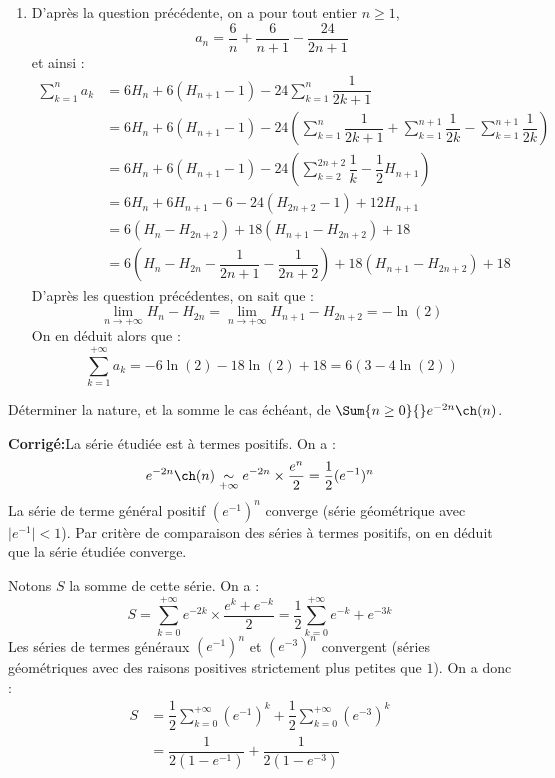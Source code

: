 \documentclass[a4paper,twoside,french,10pt]{VcCours}
\newcommand{\corr}{\textbf{Corrigé:}}
\begin{document}
\begin{enumerate}
\item D'après la question précédente, on a pour tout entier $n \geq 1$,
$$ a_n = \dfrac{6}{n} + \dfrac{6}{n+1} - \dfrac{24}{2n+1}$$
et ainsi :
\begin{align*}
\sum_{k=1}^n a_k & = 6 H_n + 6(H_{n+1}-1)- 24 \sum_{k=1}^n \dfrac{1}{2k+1} \\
& = 6 H_n + 6(H_{n+1}-1)- 24 \left( \sum_{k=1}^n \dfrac{1}{2k+1} +  \sum_{k=1}^{n+1} \dfrac{1}{2k} - \sum_{k=1}^{n+1} \dfrac{1}{2k} \right) \\
& =6 H_n + 6(H_{n+1}-1)-24 \left( \sum_{k=2}^{2n+2} \dfrac{1}{k} -  \dfrac{1}{2} H_{n+1} \right) \\
& = 6H_n + 6 H_{n+1} - 6 - 24 (H_{2n+2}-1) + 12 H_{n+1} \\
& = 6(H_n - H_{2n+2}) + 18(H_{n+1}- H_{2n+2}) + 18 \\
& = 6 \left( H_n - H_{2n} - \dfrac{1}{2n+1} - \dfrac{1}{2n+2} \right) + 18 (H_{n+1}- H_{2n+2})  + 18
\end{align*}
D'après les question précédentes, on sait que :
$$ \lim_{n \rightarrow + \infty} H_n- H_{2n} = \lim_{n \rightarrow + \infty} H_{n+1}- H_{2n+2} = - \ln(2)$$
On en déduit alors que :
$$ \sum_{k=1}^{+ \infty} a_k = -6\ln(2) -18 \ln(2) + 18 = 6(3- 4 \ln(2))$$
\end{enumerate}

\medskip

\begin{Exercice}{} Déterminer la nature, et la somme le cas échéant, de $\Sum{n \geq 0}{} e^{-2n} \ch(n)$.
\end{Exercice}

\corr La série étudiée est à termes positifs. On a :
$$ e^{-2n} \ch(n) \underset{+ \infty}{\sim} e^{-2n} \times \dfrac{e^n}{2} = \dfrac{1}{2} (e^{-1})^n$$
La série de terme général positif $(e^{-1})^n$ converge (série géométrique avec $\vert e^{-1} \vert <1$). Par critère de comparaison des séries à termes positifs, on en déduit que la série étudiée converge. 

\medskip

\noindent Notons $S$ la somme de cette série. On a :
$$ S = \sum_{k=0}^{+ \infty} e^{-2k} \times \dfrac{e^k + e^{-k}}{2} = \dfrac{1}{2} \sum_{k=0}^{+ \infty} e^{-k} + e^{-3k}$$
Les séries de termes généraux $(e^{-1})^n$ et $(e^{-3})^n$ convergent (séries géométriques avec des raisons positives strictement plus petites que $1$). On a donc :
\begin{align*}
S & = \dfrac{1}{2} \sum_{k=0}^{+ \infty} (e^{-1})^k + \dfrac{1}{2} \sum_{k=0}^{+ \infty} (e^{-3})^k \\
& = \dfrac{1}{2(1-e^{-1})} + \dfrac{1}{2(1-e^{-3})}
\end{align*}
\end{document}
